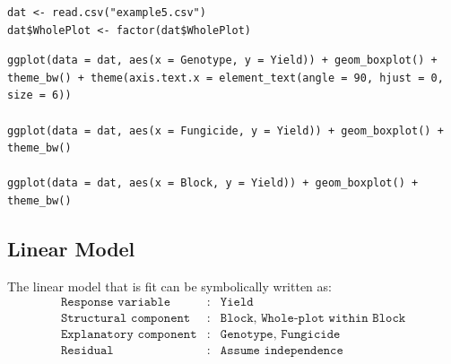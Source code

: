\documentclass[a4paper, 10pt, fleqn, twosided]{memoir}
\begin{document}
\begin{tcolorbox}[title = Import and graph the data]
\begin{verbatim}
dat <- read.csv("example5.csv")
dat$WholePlot <- factor(dat$WholePlot)
\end{verbatim}
\tcblower
\begin{verbatim}
ggplot(data = dat, aes(x = Genotype, y = Yield)) + geom_boxplot() +
theme_bw() + theme(axis.text.x = element_text(angle = 90, hjust = 0, size = 6))

ggplot(data = dat, aes(x = Fungicide, y = Yield)) + geom_boxplot() +
theme_bw()

ggplot(data = dat, aes(x = Block, y = Yield)) + geom_boxplot() +
theme_bw()
\end{verbatim}
\end{tcolorbox}


\subsection{Linear Model}
The linear model that is fit can be symbolically written as:
\begin{eqnarray*}
	\texttt{Response variable}&:& \texttt{Yield} \\
	\texttt{Structural component}&:& \texttt{Block, Whole-plot within Block}\\
	\texttt{Explanatory component}&:& \texttt{Genotype, Fungicide}\\
	\texttt{Residual}&:& \texttt{Assume independence}
\end{eqnarray*}
\end{document}
